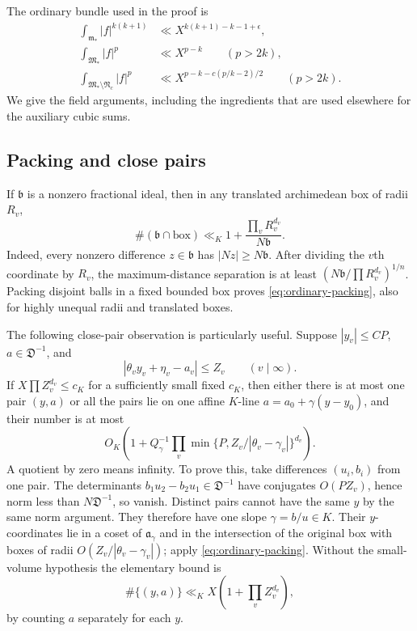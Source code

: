 \documentclass[11pt,reqno]{amsart}
\numberwithin{equation}{section}
\theoremstyle{definition}
\begin{document}
The ordinary bundle used in the proof is
\begin{align}
 \int_{\mathfrak m_*}|f|^{k(k+1)}
    &\ll X^{k(k+1)-k-1+\epsilon},\label{eq:ordinary-critical-bundle}\\
 \int_{\mathfrak M_*}|f|^p&\ll X^{p-k}\qquad(p>2k),\label{eq:ordinary-major-bundle}\\
 \int_{\mathfrak M_*\setminus\mathfrak N_c}|f|^p
    &\ll X^{p-k-c(p/k-2)/2}\qquad(p>2k).
       \label{eq:ordinary-pruning-bundle}
\end{align}
We give the field arguments, including the ingredients that are used elsewhere
for the auxiliary cubic sums.

\subsection{Packing and close pairs}

If $\mathfrak b$ is a nonzero fractional ideal, then in any translated
archimedean box of radii $R_v$,
\begin{equation}\label{eq:ordinary-packing}
 \#(\mathfrak b\cap\text{box})\ll_K
       1+\frac{\prod_vR_v^{d_v}}{N\mathfrak b}.
\end{equation}
Indeed, every nonzero difference $z\in\mathfrak b$ has
$|Nz|\ge N\mathfrak b$.  After dividing the $v$th coordinate by $R_v$,
the maximum-distance separation is at least
$(N\mathfrak b/\prod R_v^{d_v})^{1/n}$.
Packing disjoint balls in a fixed bounded box proves
\eqref{eq:ordinary-packing}, also for highly unequal radii and translated boxes.

The following close-pair observation is particularly useful.  Suppose
$|y_v|\le C P$, $a\in\mathfrak D^{-1}$, and
\[
 |\theta_vy_v+\eta_v-a_v|\le Z_v\qquad(v\mid\infty).
\]
If $X\prod Z_v^{d_v}\le c_K$ for a sufficiently small fixed $c_K$, then either
there is at most one pair $(y,a)$ or all the pairs lie on one affine $K$-line
$a=a_0+\gamma(y-y_0)$, and their number is at most
\begin{equation}\label{eq:ordinary-line}
 O_K\left(1+Q_\gamma^{-1}
       \prod_v\min\{P,Z_v/|\theta_v-\gamma_v|\}^{d_v}\right).
\end{equation}
A quotient by zero means infinity.
To prove this, take differences $(u_i,b_i)$ from one pair.
The determinants $b_1u_2-b_2u_1\in\mathfrak D^{-1}$ have conjugates
$O(PZ_v)$, hence norm less than $N\mathfrak D^{-1}$, so vanish.
Distinct pairs cannot have the same $y$ by the same norm argument.
They therefore have one slope $\gamma=b/u\in K$.
Their $y$-coordinates lie in a coset of $\mathfrak a_\gamma$ and in the
intersection of the original box with boxes of radii
$O(Z_v/|\theta_v-\gamma_v|)$; apply \eqref{eq:ordinary-packing}.
Without the small-volume hypothesis the elementary bound is
\begin{equation}\label{eq:ordinary-line-trivial}
 \#\{(y,a)\}\ll_K X\left(1+\prod_v Z_v^{d_v}\right),
\end{equation}
by counting $a$ separately for each $y$.
\end{document}
